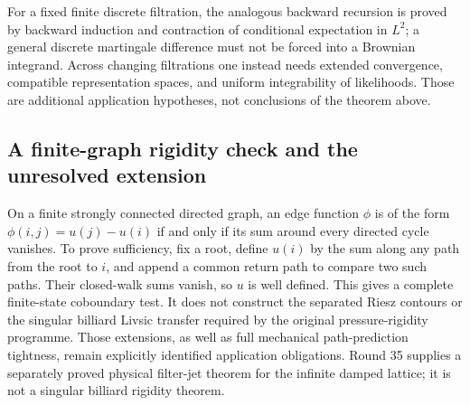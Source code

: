 For a fixed finite discrete filtration, the analogous backward recursion is proved by backward induction and contraction of conditional expectation in $L^2$; a general discrete martingale difference must not be forced into a Brownian integrand. Across changing filtrations one instead needs extended convergence, compatible representation spaces, and uniform integrability of likelihoods. Those are additional application hypotheses, not conclusions of the theorem above.

\subsection{A finite-graph rigidity check and the unresolved extension}
On a finite strongly connected directed graph, an edge function $\phi$ is of the form $\phi(i,j)=u(j)-u(i)$ if and only if its sum around every directed cycle vanishes. To prove sufficiency, fix a root, define $u(i)$ by the sum along any path from the root to $i$, and append a common return path to compare two such paths. Their closed-walk sums vanish, so $u$ is well defined. This gives a complete finite-state coboundary test. It does not construct the separated Riesz contours or the singular billiard Livsic transfer required by the original pressure-rigidity programme. Those extensions, as well as full mechanical path-prediction tightness, remain explicitly identified application obligations. Round 35 supplies a separately proved physical filter-jet theorem for the infinite damped lattice; it is not a singular billiard rigidity theorem.
